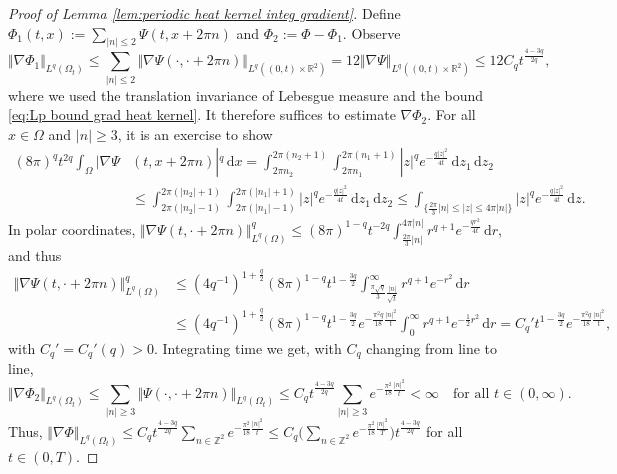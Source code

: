 \documentclass[11pt,a4paper,reqno]{amsart}
\theoremstyle{remark}
\theoremstyle{definition}
\numberwithin{equation}{section}
\renewcommand{\d}{\, \mathrm{d} }
\begin{document}
\begin{proof}[Proof of Lemma \ref{lem:periodic heat kernel integ gradient}]
Define $\Phi_1(t,x) := \sum_{|n| \leq 2}\Psi(t,x+2\pi n)$ and $\Phi_2 := \Phi - \Phi_1$. Observe 
    \begin{equation*}
        \Vert \nabla \Phi_1 \Vert_{L^q(\Omega_t)} \leq \sum_{|n| \leq 2} \Vert \nabla \Psi(\cdot,\cdot+2\pi n) \Vert_{L^q((0,t)\times\mathbb{R}^2)} = 12 \Vert \nabla \Psi \Vert_{L^q((0,t)\times\mathbb{R}^2)} \leq 12 C_q t^{\frac{4-3q}{2q}}, 
    \end{equation*}
    where we used the translation invariance of Lebesgue measure and the bound \eqref{eq:Lp bound grad heat kernel}. It therefore suffices to estimate $\nabla \Phi_2$. For all $x\in\Omega$ and $|n| \geq 3$, it is an exercise to show 
\begin{equation*}
   \begin{aligned} (8\pi)^{q} t^{2q}  \int_\Omega  |\nabla\Psi &(t,x+2\pi n)|^q \d x = \int_{2\pi n_2}^{2\pi(n_2+1)} \!\! \int_{2\pi n_1}^{2\pi(n_1+1)} |z|^q e^{-\frac{q|z|^2}{4t}} \d z_1 \d z_2 \\ 
   &\leq \int_{2\pi (|n_2|-1)}^{2\pi(|n_2|+1)} \!\! \int_{2\pi (|n_1|-1)}^{2\pi(|n_1|+1)} |z|^q e^{-\frac{q |z|^2}{4t}} \d z_1  \d z_2 \leq \int_{\{\frac{2\pi}{3}|n| \leq |z| \leq 4\pi |n| \}} \!\!\!\!\!\! |z|^q e^{-\frac{q |z|^2}{4t}} \d z. 
   \end{aligned}
\end{equation*}
In polar coordinates, $\Vert \nabla\Psi(t,\cdot +2\pi n)\Vert_{L^q(\Omega)}^q \leq (8\pi)^{1-q} t^{-2q} \int_{\frac{2\pi}{3}|n|}^{4\pi |n| } r^{q+1} e^{-\frac{q r^2}{4t}} \d r$, and thus
\begin{equation*}
   \begin{aligned} 
   \Vert \nabla\Psi(t,\cdot +2\pi n)\Vert_{L^q(\Omega)}^q \! &\leq \!\!(4q^{-1})^{1+\frac{q}{2}} (8\pi)^{1-q} t^{1-\frac{3q}{2}} \int_{\frac{\pi\sqrt{q}}{3}\frac{|n|}{\sqrt{t}}}^{\infty} r^{q+1} e^{-r^2} \d r \\ 
   &\leq \!\!(4q^{-1})^{1+\frac{q}{2}} (8\pi)^{1-q} t^{1-\frac{3q}{2}} e^{-\frac{\pi^2 q}{18}\frac{|n|^2}{t}} \!\!\int_{0}^{\infty}\!\!\!\!\! r^{q+1} e^{-\frac{1}{2}r^2} \!\! \d r \!=\! C_q' t^{1-\frac{3q}{2}} e^{-\frac{\pi^2 q}{18}\frac{|n|^2}{t}}, 
   \end{aligned}
\end{equation*}
with $C_q' = C_q'(q)>0$. Integrating time we get, with $C_q$ changing from line to line, 
\begin{equation*}
     \Vert \nabla\Phi_2 \Vert_{L^q(\Omega_t)} \leq \sum_{|n| \geq 3} \Vert \Psi(\cdot,\cdot +2\pi n)\Vert_{L^q(\Omega_t)} \leq C_q t^{\frac{4-3q}{2q}} \sum_{|n|\geq 3} e^{-\frac{\pi^2 }{18}\frac{|n|^2}{t}} < \infty \quad \text{for all } t \in (0,\infty).
\end{equation*}
 Thus, $\Vert \nabla \Phi \Vert_{L^q(\Omega_t)} \leq C_q t^{\frac{4-3q}{2q}} \sum\limits_{n\in\mathbb{Z}^2} e^{-\frac{\pi^2}{18}\frac{|n|^2}{t}} \leq C_q \Big(\sum\limits_{n\in\mathbb{Z}^2} e^{-\frac{\pi^2}{18}\frac{|n|^2}{T}}\Big)t^{\frac{4-3q}{2q}}$ for all $t \in (0,T)$. 
\end{proof}
\end{document}
